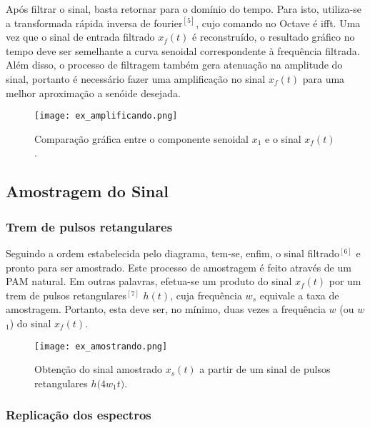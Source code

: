 \documentclass[journal]{IEEEtran}
\begin{document}
Após filtrar o sinal, basta retornar para o domínio do tempo. Para isto, utiliza-se a transformada rápida inversa de fourier$^{[5]}$, cujo comando no Octave é {\selectfont ifft}. Uma vez que o sinal de entrada filtrado $x$$_f$$(t)$ é reconstruído, o resultado gráfico no tempo deve ser semelhante a curva senoidal correspondente à frequência filtrada. Além disso, o processo de filtragem também gera atenuação na amplitude do sinal, portanto é necessário fazer uma amplificação no sinal $x$$_f$$(t)$ para uma melhor aproximação a senóide desejada.

\begin{figure}[H]
\captionsetup{justification=centering}
\centering %
\texttt{[image: ex\_amplificando.png]} %
\caption{Comparação gráfica entre o componente senoidal $x_1$ e o sinal $x$$_f$$(t)$.}
\end{figure}

\subsection{Amostragem do Sinal}

\subsubsection{Trem de pulsos retangulares}

Seguindo a ordem estabelecida pelo diagrama, tem-se, enfim, o sinal filtrado$^{[6]}$ e pronto para ser amostrado. Este processo de amostragem é feito através de um PAM natural. Em outras palavras, efetua-se um produto do sinal $x$$_f$$(t)$ por um trem de pulsos retangulares$^{[7]}$ $h(t)$, cuja frequência $w$$_s$ equivale a taxa de amostragem. Portanto, esta deve ser, no mínimo, duas vezes a frequência $w$ (ou $w$$_1$) do sinal $x$$_f$$(t)$.

\begin{figure}[H]
\captionsetup{justification=centering}
\centering %
\texttt{[image: ex\_amostrando.png]} %
\caption{Obtenção do sinal amostrado $x$$_s$$(t)$ a partir de um sinal de pulsos retangulares $h(4w$$_1$$t)$.}
\end{figure}

\subsubsection{Replicação dos espectros}
\end{document}
